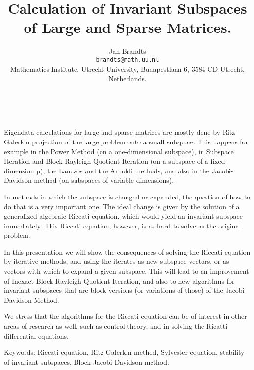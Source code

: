 \documentclass[11pt]{article}
\date{ ~ \hspace{-4mm}}
\title{Calculation of Invariant Subspaces of Large and Sparse Matrices.  }
\author{Jan Brandts \\ {\tt brandts@math.uu.nl} \\ Mathematics Institute, Utrecht University, Budapestlaan 6, 3584 CD Utrecht,  Netherlands.}
\begin{document}
\maketitle
\thispagestyle{empty}





 



Eigendata calculations for large and sparse matrices are mostly done 
by Ritz-Galerkin projection of the large problem onto a small subspace. 
This happens for example in the Power Method (on a one-dimensional 
subspace), in Subspace Iteration and Block Rayleigh Quotient Iteration (on 
a subspace of a fixed dimension p), the Lanczos and the Arnoldi methods, 
and also in the Jacobi-Davidson method (on subspaces of variable dimensions).



In methods in which the subspace is changed or expanded, the question of 
how to do that is a very important one. The ideal change is given by the 
solution of a generalized algebraic Riccati equation, which would yield
an invariant subspace immediately. This Riccati equation, however, is as
hard to solve as the original problem.



In this presentation we will show the consequences of solving the Riccati
equation by iterative methods, and using the iterates as new subspace 
vectors, or as vectors with which to expand a given subspace. This will 
lead to an improvement of Inexact Block Rayleigh Quotient Iteration, and 
also to new algorithms for invariant subspaces that are block versions 
(or variations of those) of the Jacobi-Davidson Method.



We stress that the algorithms for the Riccati equation can be of interest in
other areas of research as well, such as control theory, and in solving the
Ricatti differential equations.



Keywords: Riccati equation, Ritz-Galerkin method, Sylvester equation, stability
of invariant subspaces, Block Jacobi-Davidson method.
\end{document}
